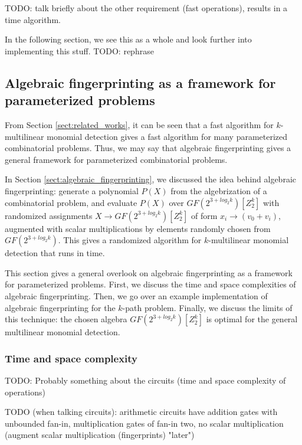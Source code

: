 TODO: talk briefly about the other requirement (fast operations), 
results in a  time algorithm.

In the following section, we see this as a whole and look further into implementing this stuff. 
TODO: rephrase

\subsection{Algebraic fingerprinting as a framework for parameterized problems}
\label{sect:algebraic_framework}

From Section \ref{sect:related_works}, 
it can be seen  
that a fast algorithm for $k$-multilinear monomial detection gives a 
fast algorithm for many parameterized combinatorial problems. Thus, we 
may say that algebraic fingerprinting gives a general framework for 
parameterized combinatorial problems. 

In Section \ref{sect:algebraic_fingerprinting}, we discussed the idea behind 
algebraic fingerprinting: generate a polynomial $P(X)$ from the algebrization of 
a combinatorial problem, and evaluate $P(X)$ over $GF(2^{3+log_2k})[Z_2^k]$ with 
randomized assignments $X \to GF(2^{3+log_2k})[Z_2^k]$ of form 
$x_i \to (v_0 + v_i)$, augmented with scalar multiplications 
by elements randomly chosen from $GF(2^{3+log_2k})$. This gives a  
randomized algorithm for $k$-multilinear monomial detection that runs in  time.

This section gives a general overlook on algebraic fingerprinting as a 
framework for parameterized problems. First, we discuss the 
{time and space complexities} of algebraic fingerprinting. Then, 
we go over an example implementation 
of algebraic fingerprinting for the $k$-path problem. 
Finally, we discuss the limits of 
this technique: the chosen algebra $GF(2^{3+log_2k})[Z_2^k]$ 
is optimal for the general multilinear monomial detection.


\subsubsection{Time and space complexity}
\label{sect:complexity}

TODO: Probably something about the circuits (time and space complexity of operations)

TODO (when talking circuits): arithmetic circuits have addition gates with unbounded fan-in, 
multiplication gates of fan-in two, no scalar multiplication 
(augment scalar multiplication (fingerprints) "later")

